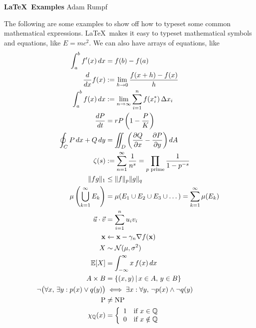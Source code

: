 \documentclass[11pt]{article}
\begin{document}
\noindent \textbf{\LaTeX\ Examples} \hfill Adam Rumpf

\quad

The following are some examples to show off how to typeset some common mathematical expressions. \LaTeX\ makes it easy to typeset mathematical symbols and equations, like $E = mc^2$. We can also have arrays of equations, like
\begin{align}
	\int_a^b f'(x) \, dx &= f(b) - f(a) \\ %
	\frac{d}{dx} f(x) &:= \lim_{h \to 0} \frac{f(x+h) - f(x)}{h} \\
	\int_a^b f(x) \, dx &:= \lim_{n \to \infty} \sum_{i=1}^n f(x_i^*) \, \Delta x_i \\
	\frac{dP}{dt} &= rP \left( 1 - \frac{P}{K} \right) \\ %
	\label{eqn:green} \oint_C P \, dx + Q \, dy &= \iint_D \left( \frac{\partial Q}{\partial x} - \frac{\partial P}{\partial y} \right) dA \\ %
	\zeta(s) &:= \sum_{n=1}^\infty \frac{1}{n^s} = \prod_{\text{$p$ prime}} \frac{1}{1 - p^{-s}} \\
	\label{eqn:holder} \|f g\|_1 &\le \|f\|_p \|g\|_q \\ %
	\mu \left( \bigcup_{k=1}^\infty E_k \right) &= \mu (E_1 \cup E_2 \cup E_3 \cup \dots) = \sum_{k=1}^\infty \mu(E_k) \\
	\vec{u} \cdot \vec{v} &= \sum_{i=1}^n u_i v_i \\
	\mathbf{x} &\gets \mathbf{x} - \gamma_n \nabla f(\mathbf{x}) \\ %
	X &\sim \mathcal{N}(\mu,\sigma^2) \\ %
	\mathbb{E}[X] &= \int_{-\infty}^\infty x \, f(x) \, dx \\ %
	A \times B &= \left\{ (x,y) \, \middle| \, x \in A, \, y \in B \right\} \\ %
	\neg \big( \forall x, \, \exists y : p(x) \lor q(y) \big) &\iff \exists x : \forall y, \, \neg p(x) \land \neg q(y) \\
	\mathrm{P} &\ne \mathrm{NP} \\ %
	\chi_{\mathbb{Q}}(x) &= \left\{ %
	\begin{array}{r l} %
		1 & \text{if $x \in \mathbb{Q}$} \\
		0 & \text{if $x \notin \mathbb{Q}$}
	\end{array}
	\right. %
\end{align}
\end{document}
